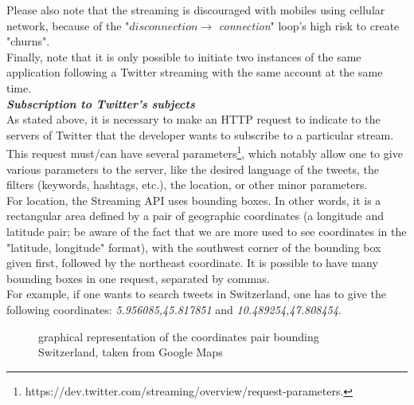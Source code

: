\documentclass[a4paper,11pt]{report}
\begin{document}
Please also note that the streaming is discouraged with mobiles using cellular network, because of the "$disconnection\to$ \emph{connection}" loop's high risk to create "churns".\\

Finally, note that it is only possible to initiate two instances of the same application following a Twitter streaming with the same account at the same time.\\

\textbf{\emph{Subscription to Twitter's subjects}}\\
As stated above, it is necessary to make an HTTP request to indicate to the servers of Twitter that the developer wants to subscribe to a particular stream. This request must/can have several parameters\footnote{https://dev.twitter.com/streaming/overview/request-parameters.}, which notably allow one to give various parameters to the server, like the desired language of the tweets, the filters (keywords, hashtags, etc.), the location, or other minor parameters.\\

For location, the Streaming API uses bounding boxes. In other words, it is a rectangular area defined by a pair of geographic coordinates (a longitude and latitude pair; be aware of the fact that we are more used to see coordinates in the "latitude, longitude" format), with the southwest corner of the bounding box given first, followed by the northeast coordinate. It is possible to have many bounding boxes in one request, separated by commas.\\

For example, if one wants to search tweets in Switzerland, one has to give the following coordinates: \emph{5.956085,45.817851} and \emph{10.489254,47.808454}.
\begin{figure}[H]
\vspace{-5pt}
\begin{center}
\vspace{-20pt}
\caption{graphical representation of the coordinates pair bounding Switzerland, taken from Google Maps}
\end{center}
\end{figure}
\end{document}
